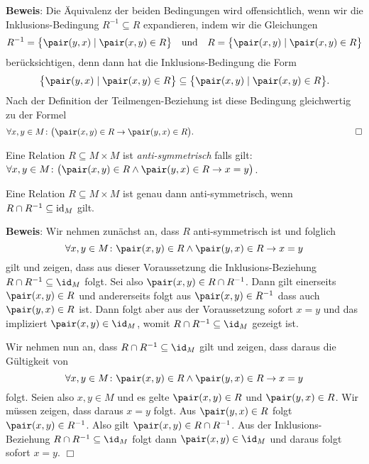 \noindent
\textbf{Beweis}:
Die Äquivalenz der beiden Bedingungen wird offensichtlich, wenn wir die Inklusions-Bedingung
$R^{-1} \subseteq R$ expandieren, indem wir die Gleichungen
\[ R^{-1} = \bigl\{ \pair(y,x) \mid \pair(x,y) \in R \bigr\} \quad \mbox{und} \quad
   R      = \bigl\{ \pair(x,y) \mid \pair(x,y) \in R \bigr\} \]
berücksichtigen, denn dann hat die Inklusions-Bedingung die Form
\[ \bigl\{ \pair(y,x) \mid \pair(x,y) \in R \bigr\} \subseteq
   \bigl\{ \pair(x,y) \mid \pair(x,y) \in R \bigr\}. \]
Nach der Definition der Teilmengen-Beziehung ist diese Bedingung gleichwertig zu der Formel
\[ \forall x, y \in M \colon \bigl(\pair(x,y) \in R \rightarrow\pair(y,x) \in R\bigr). 
   \hspace*{6.6cm} \Box \]

\begin{Definition}
Eine Relation $R \subseteq M \times M$  ist \emph{anti-symmetrisch} falls gilt: \\[0.2cm]
\hspace*{1.3cm} 
$\forall x, y \in M \colon \bigl(\pair(x,y) \in R \wedge \pair(y,x) \in R \rightarrow x = y\bigr)$.
\end{Definition}

\begin{Satz}
Eine Relation $R \subseteq M \times M$  ist genau dann anti-symmetrisch, wenn
$R \cap R^{-1} \subseteq \mbox{\rm id}_{M}$ gilt.
\end{Satz}

\noindent
\textbf{Beweis}:
Wir nehmen zunächst an, dass $R$ anti-symmetrisch ist und folglich
\[ \forall x, y \in M \colon \pair(x,y) \in R \wedge \pair(y,x) \in R \rightarrow x = y \]
gilt und zeigen, dass aus dieser Voraussetzung die Inklusions-Beziehung
$R \cap R^{-1} \subseteq \id_{M}$ folgt.  Sei also $\pair(x,y) \in R \cap R^{-1}$.
Dann gilt einerseits $\pair(x,y) \in R$ und andererseits folgt aus $\pair(x,y) \in R^{-1}$
dass auch $\pair(y,x) \in R$ ist.  Dann folgt aber aus der Voraussetzung sofort $x=y$
und das impliziert $\pair(x,y) \in \id_M$, womit $R \cap R^{-1} \subseteq \id_{M}$ 
gezeigt ist.

Wir nehmen nun an, dass $R \cap R^{-1} \subseteq \id_{M}$ gilt und zeigen, dass daraus
die Gültigkeit von 
\[ \forall x, y \in M \colon \pair(x,y) \in R \wedge \pair(y,x) \in R \rightarrow x = y \]
folgt.  Seien also $x,y \in M$ und es gelte $\pair(x,y) \in R$ und $\pair(y,x) \in R$.
Wir müssen zeigen, dass daraus $x=y$ folgt.  Aus $\pair(y,x) \in R$ folgt 
$\pair(x,y) \in R^{-1}$.  Also gilt $\pair(x,y) \in R \cap R^{-1}$.
Aus der Inklusions-Beziehung $R \cap R^{-1} \subseteq \id_{M}$ folgt dann
$\pair(x,y) \in \id_M$ und daraus folgt sofort $x = y$. \hspace*{\fill} $\Box$

